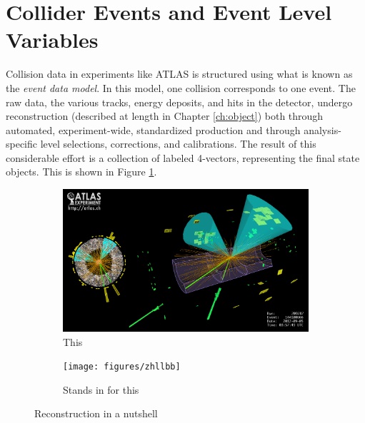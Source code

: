 \section{Collider Events and Event Level Variables}
Collision data in experiments like ATLAS is structured using what is known as the \emph{event data model}.  In this model, one collision corresponds to one event.  The raw data, the various tracks, energy deposits, and hits in the detector, undergo reconstruction (described at length in Chapter \ref{ch:object}) both through automated, experiment-wide, standardized production and through analysis-specific level selections, corrections, and calibrations.  The result of this considerable effort is a collection of labeled 4-vectors, representing the final state objects.  This is shown in Figure \ref{fig:recon}.

\begin{figure}[!htbp]\captionsetup{justification=centering}
  \centering
  \begin{subfigure}[t]{0.420000\textwidth}\centering\includegraphics[width=\textwidth]{figures/atlas/atlas_3dzhllbb}\caption{This}\end{subfigure}
  \begin{subfigure}[t]{0.420000\textwidth}\centering\texttt{[image: figures/zhllbb]}\caption{Stands in for this}\end{subfigure}
  \caption{Reconstruction in a nutshell}
  \label{fig:recon}
\end{figure}

